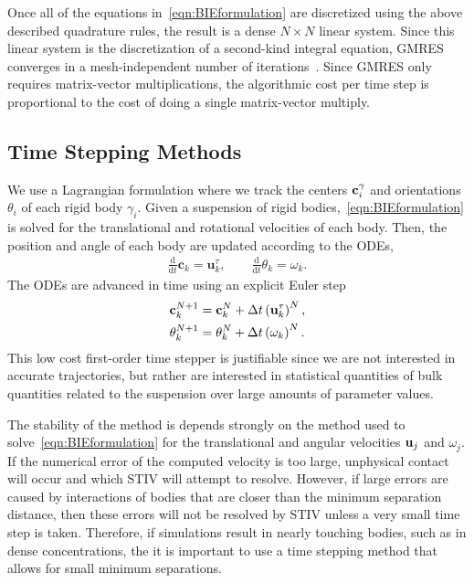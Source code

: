 \documentclass[preprint, 10pt]{elsarticle}
\begin{document}
Once all of the equations in~\eqref{eqn:BIEformulation} are discretized
using the above described quadrature rules, the result is a dense $N
\times N$ linear system.  Since this linear system is the discretization
of a second-kind integral equation, GMRES~\cite{Saad1986} converges in a
mesh-independent number of iterations~\cite{Campbell1996}.  Since GMRES
only requires matrix-vector multiplications, the algorithmic cost per
time step is proportional to the cost of doing a single matrix-vector
multiply.


\subsection{Time Stepping Methods}
\label{sec:temporal}

We use a Lagrangian formulation where we track the centers
${\mathbf{c}}_i^\gamma$ and orientations $\theta_i$ of each rigid body
$\gamma_i$. Given a suspension of rigid
bodies,~\eqref{eqn:BIEformulation} is solved for the translational and
rotational velocities of each body. Then, the position and angle of each
body are updated according to the ODEs,
\begin{align*}
  \frac{\text{d}}{\text{d}t}\mathbf{c}_k = \mathbf{u}^\tau_k, \qquad
  \frac{\text{d}}{\text{d}t}\theta_k =\omega_k.
\end{align*}
The ODEs are advanced in time using an explicit Euler step
\begin{align*}
  {\mathbf{c}}_k^{N+1} &= {\mathbf{c}}_k^N + \Delta t \left({\mathbf{u}}_k^\tau\right)^N, \\
  \theta_k^{N+1} &= \theta_k^N + \Delta t \left(\omega_k\right)^N.
\end{align*}
This low cost first-order time stepper is justifiable since we are
not interested in accurate trajectories, but rather are
interested in statistical quantities of bulk quantities related to the
suspension over large amounts of parameter values.

The stability of the method is depends strongly on the method used to
solve~\eqref{eqn:BIEformulation} for the translational and angular
velocities ${\mathbf{u}}_j$ and $\omega_j$. If the numerical error of the
computed velocity is too large, unphysical contact will occur and
which STIV will attempt to resolve.  However, if large errors are caused
by interactions of bodies that are closer than the minimum separation
distance, then these errors will not be resolved by STIV unless a very
small time step is taken.  Therefore, if simulations result in nearly
touching bodies, such as in dense concentrations, the it is important to
use a time stepping method that allows for small minimum separations.
\end{document}
